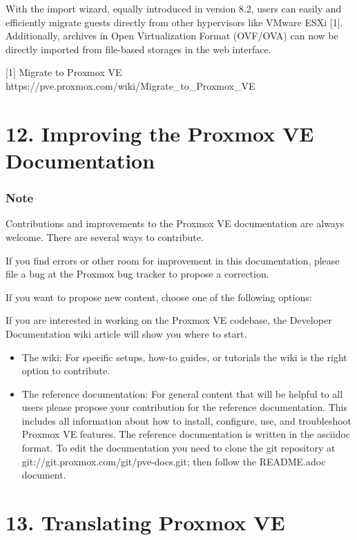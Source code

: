 With the import wizard, equally introduced in version 8.2, users can easily and efficiently migrate guests directly from other hypervisors like VMware ESXi [1]. Additionally, archives in Open Virtualization Format (OVF/OVA) can now be directly imported from file-based storages in the web interface.

[1] Migrate to Proxmox VE https://pve.proxmox.com/wiki/Migrate_to_Proxmox_VE


\section{12. Improving the Proxmox VE Documentation}

\subsubsection{Note}

Contributions and improvements to the Proxmox VE documentation are always welcome. There are several ways to contribute.

If you find errors or other room for improvement in this documentation, please file a bug at the Proxmox bug tracker to propose a correction.

If you want to propose new content, choose one of the following options:

If you are interested in working on the Proxmox VE codebase, the Developer Documentation wiki article will show you where to start.

\begin{itemize}[leftmargin=2cm]

	\item The wiki: For specific setups, how-to guides, or tutorials the wiki is the right option to contribute.

	\item The reference documentation: For general content that will be helpful to all users please propose your contribution for the reference documentation. This includes all information about how to install, configure, use, and troubleshoot Proxmox VE features. The reference documentation is written in the asciidoc format. To edit the documentation you need to clone the git repository at git://git.proxmox.com/git/pve-docs.git; then follow the README.adoc document.

\end{itemize}


\section{13. Translating Proxmox VE}

